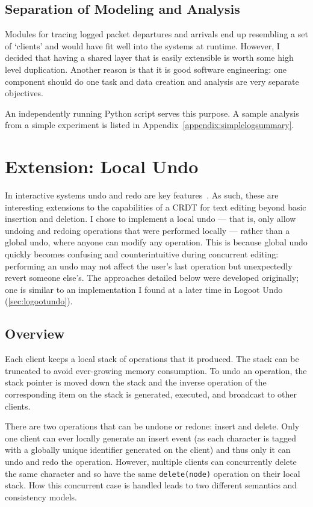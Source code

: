 \documentclass[12pt,a4paper,twoside,openright]{report}
\begin{document}
	
	\subsection{Separation of Modeling and Analysis}
	
	Modules for tracing logged packet departures and arrivals end up resembling a set of `clients' and would have fit well into the systems at runtime. However, I decided that having a shared layer that is easily extensible is worth some high level duplication. Another reason is that it is good software engineering: one component should do one task and data creation and analysis are very separate objectives.
	
	An independently running Python script serves this purpose. A sample analysis from a simple experiment is listed in Appendix~\ref{appendix:simplelogsummary}.	
	
	
	
\section{Extension: Local Undo} \label{sec:undo}
	
	In interactive systems undo and redo are key features~\cite{shneiderman1982}. As such, these are interesting extensions to the capabilities of a CRDT for text editing beyond basic insertion and deletion. I chose to implement a local undo --- that is, only allow undoing and redoing operations that were performed locally --- rather than a global undo, where anyone can modify any operation. This is because global undo quickly becomes confusing and counterintuitive during concurrent editing: performing an undo may not affect the user's last operation but unexpectedly revert someone else's. The approaches detailed below were developed originally; one is similar to an implementation I found at a later time in Logoot Undo (\cref{sec:logootundo}).
	
	\subsection{Overview}
	Each client keeps a local stack of operations that it produced. The stack can be truncated to avoid ever-growing memory consumption. To undo an operation, the stack pointer is moved down the stack and the inverse operation of the corresponding item on the stack is generated, executed, and broadcast to other clients.
	
	There are two operations that can be undone or redone: insert and delete. Only one client can ever locally generate an insert event (as each character is tagged with a globally unique identifier generated on the client) and thus only it can undo and redo the operation. However, multiple clients can concurrently delete the same character and so have the same \texttt{delete(node)} operation on their local stack. How this concurrent case is handled leads to two different semantics and consistency models.
	
\end{document}
